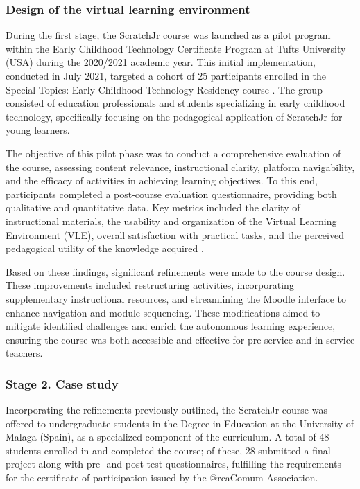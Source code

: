 \documentclass[english]{textolivre}
\begin{document}
\subsubsection{Design of the virtual learning environment}\label{sec-contributors-expl}
During the first stage, the ScratchJr course was launched as a pilot program within the Early Childhood Technology Certificate Program at Tufts University (USA) during the 2020/2021 academic year. This initial implementation, conducted in July 2021, targeted a cohort of 25 participants enrolled in the Special Topics: Early Childhood Technology Residency course \cite{mirandapinto2022scratchjr}. The group consisted of education professionals and students specializing in early childhood technology, specifically focusing on the pedagogical application of ScratchJr for young learners.

The objective of this pilot phase was to conduct a comprehensive evaluation of the course, assessing content relevance, instructional clarity, platform navigability, and the efficacy of activities in achieving learning objectives. To this end, participants completed a post-course evaluation questionnaire, providing both qualitative and quantitative data. Key metrics included the clarity of instructional materials, the usability and organization of the Virtual Learning Environment (VLE), overall satisfaction with practical tasks, and the perceived pedagogical utility of the knowledge acquired \cite{mirandapinto2022scratchjr}.

Based on these findings, significant refinements were made to the course design. These improvements included restructuring activities, incorporating supplementary instructional resources, and streamlining the Moodle interface to enhance navigation and module sequencing. These modifications aimed to mitigate identified challenges and enrich the autonomous learning experience, ensuring the course was both accessible and effective for pre-service and in-service teachers.

\subsubsection{Stage 2. Case study}\label{sec-conclusao}
Incorporating the refinements previously outlined, the ScratchJr course was offered to undergraduate students in the Degree in Education at the University of Malaga (Spain), as a specialized component of the curriculum. A total of 48 students enrolled in and completed the course; of these, 28 submitted a final project along with pre- and post-test questionnaires, fulfilling the requirements for the certificate of participation issued by the @rcaComum Association.
\end{document}
